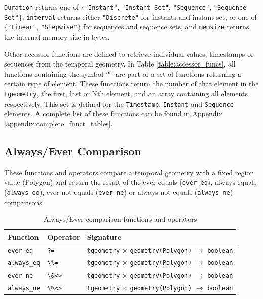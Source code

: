 \lstinline{Duration} returns one of $\{$\lstinline{"Instant"}, \lstinline{"Instant Set"}, \lstinline{"Sequence"}, \lstinline{"Sequence Set"}$\}$, \lstinline{interval} returns either \lstinline{"Discrete"} for instants and instant set, or one of $\{$\lstinline{"Linear"}, \lstinline{"Stepwise"}$\}$ for sequences and sequence sets, and \lstinline{memsize} returns the internal memory size in bytes.

Other accessor functions are defined to retrieve individual values, timestamps or sequences from the temporal geometry. In Table \ref{table:accessor_funcs}, all functions containing the symbol '*' are part of a set of functions returning a certain type of element. These functions return the number of that element in the \lstinline+tgeometry+, the first, last or Nth element, and an array containing all elements respectively. This set is defined for the \lstinline{Timestamp}, \lstinline{Instant} and \lstinline{Sequence} elements. A complete list of these functions can be found in Appendix \ref{appendix:complete_funct_tables}.

\subsection{Always/Ever Comparison}
\label{section:always_ever}

These functions and operators compare a temporal geometry with a fixed region value (Polygon) and return the result of the ever equals (\lstinline+ever_eq+), always equals (\lstinline+always_eq+), ever not equals (\lstinline+ever_ne+) or always not equals (\lstinline+always_ne+) comparisons. \\

\begin{table}[h!]
    \centering
    \begin{tabularx}{\textwidth}{|l|l|X|}
    \hline
    \textbf{Function}   & \textbf{Operator} & \textbf{Signature} \\
    \hline
    \lstinline+ever_eq+    & \lstinline+?=+      & \lstinline+tgeometry+ $\times$ \lstinline+geometry(Polygon)+ $\rightarrow$ \lstinline+boolean+ \\
    \hline
    \lstinline+always_eq+  & \lstinline+\%=+     & \lstinline+tgeometry+ $\times$ \lstinline+geometry(Polygon)+ $\rightarrow$ \lstinline+boolean+ \\
    \hline
    \lstinline+ever_ne+    & \lstinline+\&<>+    & \lstinline+tgeometry+ $\times$ \lstinline+geometry(Polygon)+ $\rightarrow$ \lstinline+boolean+ \\
    \hline
    \lstinline+always_ne+  & \lstinline+\%<>+    & \lstinline+tgeometry+ $\times$ \lstinline+geometry(Polygon)+ $\rightarrow$ \lstinline+boolean+ \\
    \hline
    \end{tabularx}
    \caption{Always/Ever comparison functions and operators}
    \label{table:always_ever_funcs}
\end{table}

